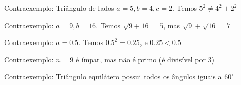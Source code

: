 \begin{exercises*}
\begin{exercise}
  \begin{answer}
    \begin{alphalist}
      \item Contraexemplo: Triângulo de lados $a=5, b=4, c=2$.
            Temos $5^2 \neq 4^2 + 2^2$
      \item Contraexemplo: $a=9, b=16$.
            Temos $\sqrt{9+16}=5$, mas $\sqrt{9}+\sqrt{16}=7$
      \item Contraexemplo: $a=0.5$.
            Temos $0.5^2 = 0.25$, e $0.25 < 0.5$
      \item Contraexemplo: $n=9$ é ímpar,
            mas não é primo (é divisível por 3)
      \item Contraexemplo: Triângulo equilátero possui todos os
            ângulos iguais a $60^\circ$
    \end{alphalist}
  \end{answer}
\end{exercise}

\end{exercises*}

